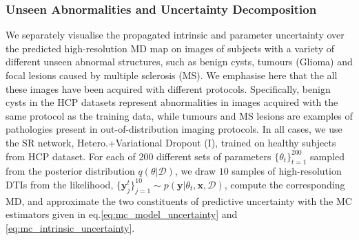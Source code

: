 

\subsubsection{Unseen Abnormalities and Uncertainty Decomposition} \label{sec:unseen_abnormality}
We separately visualise the propagated intrinsic and parameter uncertainty over the predicted high-resolution MD map on images of subjects with a variety of different unseen abnormal structures, such as benign cysts, tumours (Glioma) and focal lesions caused by multiple sclerosis (MS). We emphasise here that the all these images have been acquired with different protocols. Specifically, benign cysts in the HCP datasets represent abnormalities in images acquired with the same protocol as the training data, while tumours and MS lesions are examples of pathologies present in out-of-distribution imaging protocols. In all cases, we use the SR network, Hetero.+Variational Dropout (I), trained on healthy subjects from HCP dataset. For each of $200$ different sets of parameters $\{\theta_{t}\}_{t=1}^{200}$ sampled from the posterior distribution $q(\theta|\mathcal{D})$,  we draw $10$ samples of high-resolution DTIs from the likelihood, $\{\mathbf{y}^{t}_{j}\}_{j=1}^{10} \sim p(\mathbf{y}|\theta_{t},\mathbf{x},\mathcal{D})$, compute the corresponding MD, and approximate the two constituents of predictive uncertainty with the MC estimators given in eq.\eqref{eq:mc_model_uncertainty} and \eqref{eq:mc_intrinsic_uncertainty}. 

